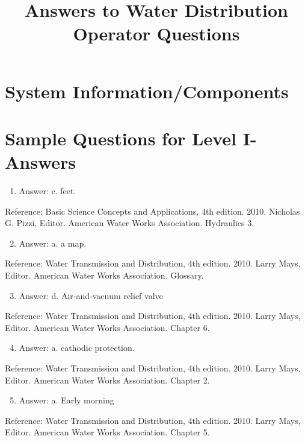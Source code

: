 \documentclass[10pt]{article}
\title{Answers to Water Distribution Operator Questions }
\author{}
\date{}
\begin{document}
\maketitle
\section{System Information/Components}
\section{Sample Questions for Level I-Answers}
\begin{enumerate}
  \item Answer: c. feet.
\end{enumerate}

Reference: Basic Science Concepts and Applications, 4th edition. 2010. Nicholas G. Pizzi, Editor. American Water Works Association. Hydraulics 3.

\begin{enumerate}
  \setcounter{enumi}{1}
  \item Answer: a. a map.
\end{enumerate}

Reference: Water Transmission and Distribution, 4th edition. 2010. Larry Mays, Editor. American Water Works Association. Glossary.

\begin{enumerate}
  \setcounter{enumi}{2}
  \item Answer: d. Air-and-vacuum relief valve
\end{enumerate}

Reference: Water Transmission and Distribution, 4th edition. 2010. Larry Mays, Editor. American Water Works Association. Chapter 6.

\begin{enumerate}
  \setcounter{enumi}{3}
  \item Answer: a. cathodic protection.
\end{enumerate}

Reference: Water Transmission and Distribution, 4th edition. 2010. Larry Mays, Editor. American Water Works Association. Chapter 2.

\begin{enumerate}
  \setcounter{enumi}{4}
  \item Answer: a. Early morning
\end{enumerate}

Reference: Water Transmission and Distribution, 4th edition. 2010. Larry Mays, Editor. American Water Works Association. Chapter 5.
\end{document}
